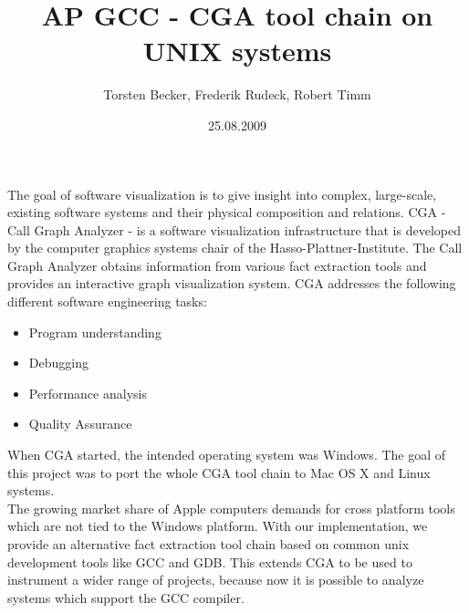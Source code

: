 \documentclass[a4paper,11pt]{article}
\title{AP GCC - CGA tool chain on UNIX systems}
\author{ Torsten Becker, Frederik Rudeck, Robert Timm }
\date{25.08.2009}
\begin{document}
\lstset{language=C++}

\ifpdf {} \else {} \fi

\maketitle
The goal of software visualization is to give insight into complex, large-scale, existing software systems and their physical composition and relations. CGA - Call Graph Analyzer - is a software visualization infrastructure that is developed by the computer graphics systems chair of the Hasso-Plattner-Institute. The Call Graph Analyzer obtains information from various fact extraction tools and provides an interactive graph visualization system. CGA addresses the following different software engineering tasks:

\begin{itemize}
	\item Program understanding
	\item Debugging
	\item Performance analysis
	\item Quality Assurance
\end{itemize}

When CGA started, the intended operating system was Windows. The goal of this project was to port the whole CGA tool chain to Mac OS X and Linux systems.\\

The growing market share of Apple computers demands for cross platform tools which are not tied to the Windows platform. With our implementation, we provide an alternative fact extraction tool chain based on common unix development tools like GCC and GDB. This extends CGA to be used to instrument a wider range of projects, because now it is possible to analyze systems which support the GCC compiler.
\newpage

\tableofcontents
\newpage


\setlength{\parskip}{0.27cm}


 

\newpage

 

\newpage

 

\newpage

 

\newpage

 

\newpage

 

\newpage

 

\newpage

 

 

\end{document}
